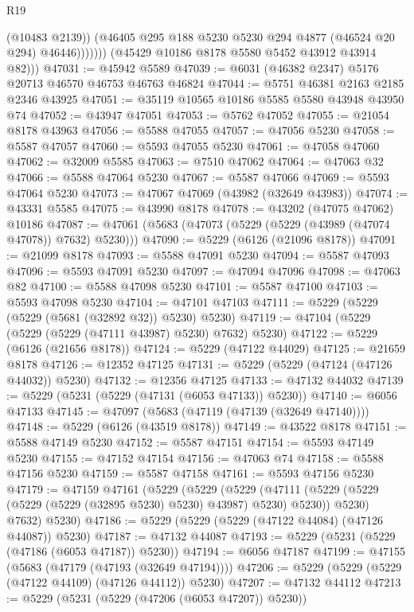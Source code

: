 \begin{lexlean}{R19}
\begin{coremodule}
                      (@10483 @2139))
                    (@46405 @295 @188 @5230 @5230 @294 @4877 (@46524 @20 @294) @46446)))))))
        (@45429 @10186 @8178 @5580 @5452 @43912 @43914 @82)))
@47031 := @45942 @5589
@47039 := @6031 (@46382 @2347) @5176 @20713 @46570 @46753 @46763 @46824
@47044 := @5751 @46381 @2163 @2185 @2346 @43925
@47051 := @35119 @10565 @10186 @5585 @5580 @43948 @43950 @74
@47052 := @43947 @47051
@47053 := @5762 @47052
@47055 := @21054 @8178 @43963
@47056 := @5588 @47055
@47057 := @47056 @5230
@47058 := @5587 @47057
@47060 := @5593 @47055 @5230
@47061 := @47058 @47060
@47062 := @32009 @5585
@47063 := @7510 @47062
@47064 := @47063 @32
@47066 := @5588 @47064 @5230
@47067 := @5587 @47066
@47069 := @5593 @47064 @5230
@47073 := @47067 @47069 (@43982 (@32649 @43983))
@47074 := @43331 @5585
@47075 := @43990 @8178
@47078 := @43202 (@47075 @47062) @10186
@47087 := @47061 (@5683 (@47073 (@5229 (@5229 (@43989 (@47074 @47078)) @7632) @5230)))
@47090 := @5229 (@6126 (@21096 @8178))
@47091 := @21099 @8178
@47093 := @5588 @47091 @5230
@47094 := @5587 @47093
@47096 := @5593 @47091 @5230
@47097 := @47094 @47096
@47098 := @47063 @82
@47100 := @5588 @47098 @5230
@47101 := @5587 @47100
@47103 := @5593 @47098 @5230
@47104 := @47101 @47103
@47111 := @5229 (@5229 (@5229 (@5681 (@32892 @32)) @5230) @5230)
@47119 := @47104 (@5229 (@5229 (@5229 (@47111 @43987) @5230) @7632) @5230)
@47122 := @5229 (@6126 (@21656 @8178))
@47124 := @5229 (@47122 @44029)
@47125 := @21659 @8178
@47126 := @12352 @47125
@47131 := @5229 (@5229 (@47124 (@47126 @44032)) @5230)
@47132 := @12356 @47125
@47133 := @47132 @44032
@47139 := @5229 (@5231 (@5229 (@47131 (@6053 @47133)) @5230))
@47140 := @6056 @47133
@47145 := @47097 (@5683 (@47119 (@47139 (@32649 @47140))))
@47148 := @5229 (@6126 (@43519 @8178))
@47149 := @43522 @8178
@47151 := @5588 @47149 @5230
@47152 := @5587 @47151
@47154 := @5593 @47149 @5230
@47155 := @47152 @47154
@47156 := @47063 @74
@47158 := @5588 @47156 @5230
@47159 := @5587 @47158
@47161 := @5593 @47156 @5230
@47179 := @47159
    @47161
    (@5229
      (@5229
        (@5229
          (@47111 (@5229 (@5229 (@5229 (@5229 (@32895 @5230) @5230) @43987) @5230) @5230))
          @5230)
        @7632)
      @5230)
@47186 := @5229 (@5229 (@5229 (@47122 @44084) (@47126 @44087)) @5230)
@47187 := @47132 @44087
@47193 := @5229 (@5231 (@5229 (@47186 (@6053 @47187)) @5230))
@47194 := @6056 @47187
@47199 := @47155 (@5683 (@47179 (@47193 (@32649 @47194))))
@47206 := @5229 (@5229 (@5229 (@47122 @44109) (@47126 @44112)) @5230)
@47207 := @47132 @44112
@47213 := @5229 (@5231 (@5229 (@47206 (@6053 @47207)) @5230))

\end{coremodule}
\end{lexlean}
